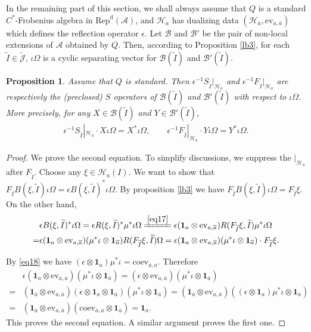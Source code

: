 \documentclass[12pt,a4paper]{article}
\theoremstyle{definition}
\theoremstyle{plain}
\newtheorem{pp}[df]{Proposition}
\newcommand{\mc}{\mathcal}
\newcommand{\wtd}{\widetilde}
\newcommand{\ovl}{\overline}
\newcommand{\id}{\mathbf{1}}
\newcommand{\ev}{\mathrm{ev}}
\newcommand{\coev}{\mathrm{coev}}
\newcommand{\Jtd}{\widetilde{\mathcal J}}
\newcommand{\RepdA}{\mathrm{Rep}^{\mathrm d}(\mc A)}
\numberwithin{equation}{section}
\begin{document}
In the remaining part of this section, we shall always assume that $Q$ is a standard  $C^*$-Frobenius algebra in $\RepdA$, and $\mc H_a$ has dualizing data $(\mc H_{\ovl a},\ev_{a,\ovl a})$ which defines the reflection operator $\epsilon$. Let $\mc B$ and $\mc B'$ be the pair of non-local extensions of $\mc A$ obtained by $Q$. Then, according to Proposition \ref{lb3}, for each $\wtd I\in\Jtd$, $\iota\Omega$ is a cyclic separating vector for $\mc B(\wtd I)$ and $\mc B'(\wtd I)$. 

\begin{pp}\label{lb9}
Assume that $Q$ is standard. Then $\epsilon^{-1}S_{\wtd I}|_{\mc H_a}$ and $\epsilon^{-1}F_{\wtd I}|_{\mc H_a}$ are respectively the (preclosed) $S$ operators of $\mc B(\wtd I)$ and $\mc B'(\wtd I)$ with respect to $\iota\Omega$. More precisely, for any $X\in\mc B(\wtd I)$ and $Y\in\mc B'(\wtd I)$,
\begin{align}
\epsilon^{-1}S_{\wtd I}|_{\mc H_a}\cdot X\iota\Omega=X^*\iota\Omega,\qquad \epsilon^{-1}F_{\wtd I}|_{\mc H_a}\cdot Y\iota\Omega=Y^*\iota\Omega.
\end{align}
\end{pp}
\begin{proof}
We prove the second equation. To simplify discussions, we suppress the $|_{\mc H_a}$ after $F_{\wtd I}$. Choose any $\xi\in\mc H_a(I)$. We want to show that $F_{\wtd I}B(\xi,\wtd I)\iota\Omega=\epsilon B(\xi,\wtd I)^*\iota\Omega$. By proposition \ref{lb3} we have $F_{\wtd I}B(\xi,\wtd I)\iota\Omega=F_{\wtd I}\xi$. On the other hand,
\begin{align*}
&\epsilon B(\xi,\wtd I)^*\iota\Omega=\epsilon R(\xi,\wtd I)^*\mu^*\iota\Omega \xlongequal{\eqref{eq17}} \epsilon(\id_a\otimes\ev_{a,\ovl a})R(F_{\wtd I}\xi,\wtd I)\mu^*\iota\Omega\\
=&\epsilon(\id_a\otimes\ev_{a,\ovl a})(\mu^*\iota\otimes\id_{\ovl a})R(F_{\wtd I}\xi,\wtd I)\Omega=\epsilon(\id_a\otimes\ev_{a,\ovl a})(\mu^*\iota\otimes\id_{\ovl a})\cdot F_{\wtd I}\xi.
\end{align*}

By \eqref{eq18} we have $(\epsilon\otimes\id_a)\mu^*\iota=\coev_{\ovl a,a}$. Therefore
\begin{align*}
&\epsilon(\id_a\otimes\ev_{a,\ovl a})(\mu^*\iota\otimes\id_{\ovl a})=(\epsilon\otimes\ev_{a,\ovl a})(\mu^*\iota\otimes\id_{\ovl a})\\
=&(\id_{\ovl a}\otimes\ev_{a,\ovl a})(\epsilon\otimes\id_a\otimes\id_{\ovl a})(\mu^*\iota\otimes\id_{\ovl a})=(\id_{\ovl a}\otimes\ev_{a,\ovl a})((\epsilon\otimes\id_a)\mu^*\iota\otimes\id_{\ovl a})\\
=&(\id_{\ovl a}\otimes\ev_{a,\ovl a})(\coev_{\ovl a,a}\otimes\id_{\ovl a})=\id_{\ovl a}.
\end{align*}
This proves the second equation. A similar argument proves the first one.
\end{proof}
\end{document}
